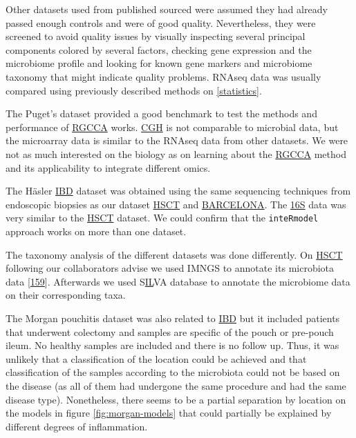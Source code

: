 \documentclass[
  12pt,
  a4paper,
  twoside,
  openright]{book}
\begin{document}
Other datasets used from published sourced were assumed they had already passed enough controls and were of good quality.
Nevertheless, they were screened to avoid quality issues by visually inspecting several principal components colored by several factors, checking gene expression and the microbiome profile and looking for known gene markers and microbiome taxonomy that might indicate quality problems.
RNAseq data was usually compared using previously described methods on \ref{statistics}.

The Puget's dataset provided a good benchmark to test the methods and performance of \protect\hyperlink{acronyms_RGCCA}{RGCCA} works.
\protect\hyperlink{acronyms_CGH}{CGH} is not comparable to microbial data, but the microarray data is similar to the RNAseq data from other datasets.
We were not as much interested on the biology as on learning about the \protect\hyperlink{acronyms_RGCCA}{RGCCA} method and its applicability to integrate different omics.

The Häsler \protect\hyperlink{acronyms_IBD}{IBD} dataset was obtained using the same sequencing techniques from endoscopic biopsies as our dataset \protect\hyperlink{acronyms_HSCT}{HSCT} and \protect\hyperlink{acronyms_BARCELONA}{BARCELONA}.
The \protect\hyperlink{acronyms_16S}{16S} data was very similar to the \protect\hyperlink{acronyms_HSCT}{HSCT} dataset.
We could confirm that the \texttt{inteRmodel} approach works on more than one dataset.

The taxonomy analysis of the different datasets was done differently.
On \protect\hyperlink{acronyms_HSCT}{HSCT} following our collaborators advise we used IMNGS to annotate its microbiota data {[}\protect\hyperlink{ref-lagkouvardos2016}{159}{]}.
Afterwards we used S\protect\hyperlink{acronyms_IL}{IL}VA database to annotate the microbiome data on their corresponding taxa.

The Morgan pouchitis dataset was also related to \protect\hyperlink{acronyms_IBD}{IBD} but it included patients that underwent colectomy and samples are specific of the pouch or pre-pouch ileum.
No healthy samples are included and there is no follow up.
Thus, it was unlikely that a classification of the location could be achieved and that classification of the samples according to the microbiota could not be based on the disease (as all of them had undergone the same procedure and had the same disease type).
Nonetheless, there seems to be a partial separation by location on the models in figure \ref{fig:morgan-models} that could partially be explained by different degrees of inflammation.
\end{document}
